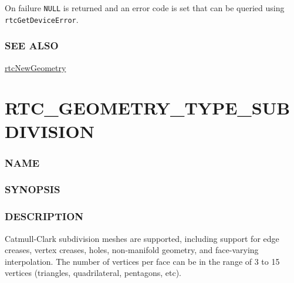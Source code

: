 On failure \texttt{NULL} is returned and an error code is set that can
be queried using \texttt{rtcGetDeviceError}.

\subsubsection{SEE ALSO}\label{see-also}

\hyperref[rtcnewgeometry]{rtcNewGeometry}

\pagebreak

\section{RTC\_GEOMETRY\_TYPE\_SUBDIVISION}\label{rtc_geometry_type_subdivision}

\subsubsection{NAME}\label{name}

\begin{Shaded}
\begin{Highlighting}[]
\OperatorTok{{-}}
\end{Highlighting}
\end{Shaded}

\subsubsection{SYNOPSIS}\label{synopsis}

\begin{Shaded}
\begin{Highlighting}[]

\OperatorTok{=}
\OperatorTok{(}\OperatorTok{,}\OperatorTok{);}
\end{Highlighting}
\end{Shaded}

\subsubsection{DESCRIPTION}\label{description}

Catmull-Clark subdivision meshes are supported, including support for
edge creases, vertex creases, holes, non-manifold geometry, and
face-varying interpolation. The number of vertices per face can be in
the range of 3 to 15 vertices (triangles, quadrilateral, pentagons,
etc).

